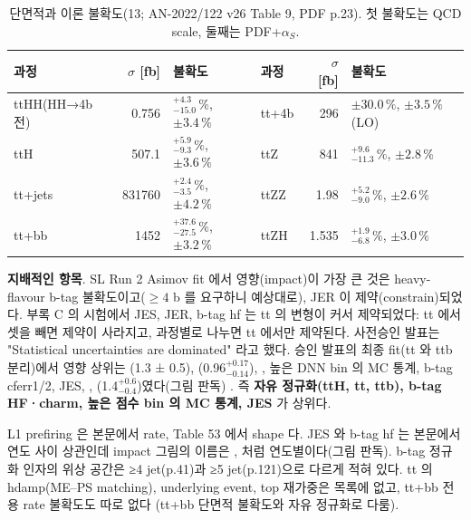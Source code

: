 \begin{table}[htbp]
\centering
\caption{단면적과 이론 불확도(13\TeV; AN-2022/122 v26 Table 9, PDF p.23). 첫 불확도는 QCD scale, 둘째는 PDF+$\alpha_S$.}
\label{tab:syst-xsec}
\small
\begin{tabular}{@{}lrl@{\qquad}lrl@{}}
\toprule
과정 & $\sigma$ [fb] & 불확도 & 과정 & $\sigma$ [fb] & 불확도 \\
\midrule
ttHH(HH→4b 전) & 0.756 & $^{+4.3}_{-15.0}\,\%$, $\pm3.4\,\%$ & tt+4b & 296 & $\pm30.0\,\%$, $\pm3.5\,\%$(LO) \\
ttH & 507.1 & $^{+5.9}_{-9.3}\,\%$, $\pm3.6\,\%$ & ttZ & 841 & $^{+9.6}_{-11.3}\,\%$, $\pm2.8\,\%$ \\
tt+jets & 831760 & $^{+2.4}_{-3.5}\,\%$, $\pm4.2\,\%$ & ttZZ & 1.98 & $^{+5.2}_{-9.0}\,\%$, $\pm2.6\,\%$ \\
tt+bb & 1452 & $^{+37.6}_{-27.5}\,\%$, $\pm3.2\,\%$ & ttZH & 1.535 & $^{+1.9}_{-6.8}\,\%$, $\pm3.0\,\%$ \\
\bottomrule
\end{tabular}
\end{table}

\textbf{지배적인 항목}. SL Run 2 Asimov fit 에서 영향(impact)이 가장 큰 것은 heavy-flavour b-tag 불확도이고($\ge4$ b 를 요구하니 예상대로), JER 이
제약(constrain)되었다. 부록 C 의 시험에서 JES, JER, b-tag hf 는 tt 의 변형이 커서 제약되었다: tt 에서 셋을 빼면 제약이
사라지고, 과정별로 나누면 tt 에서만 제약된다. 사전승인 발표는 "Statistical uncertainties are dominated" 라고
했다. 승인 발표의 최종 fit(tt 와 ttb 분리)에서 영향 상위는 (1.3 ± 0.5), (0.96$^{+0.17}_{-0.14}$),
, 높은 DNN bin 의 MC 통계, b-tag cferr1/2, JES, , (1.4$^{+0.6}_{-0.4}$)였다(그림 판독)
. 즉 \textbf{자유 정규화(ttH, tt, ttb), b-tag HF·charm, 높은 점수 bin 의 MC 통계, JES} 가 상위다.

\begin{note}[AN 안의 엇갈림과 빠진 것]
L1 prefiring 은 본문에서 rate, Table 53 에서 shape 다. JES 와 b-tag hf 는 본문에서 연도 사이 상관인데 impact 그림의
이름은 ,  처럼 연도별이다(그림 판독). b-tag 정규화 인자의 위상 공간은 ≥4 jet(p.41)과
≥5 jet(p.121)으로 다르게 적혀 있다. tt 의 hdamp(ME–PS matching), underlying event, top \pt 재가중은 목록에 없고, tt+bb 전용 rate 불확도도 따로 없다
(tt+bb 단면적 불확도와 자유 정규화로 다룸).
\end{note}

